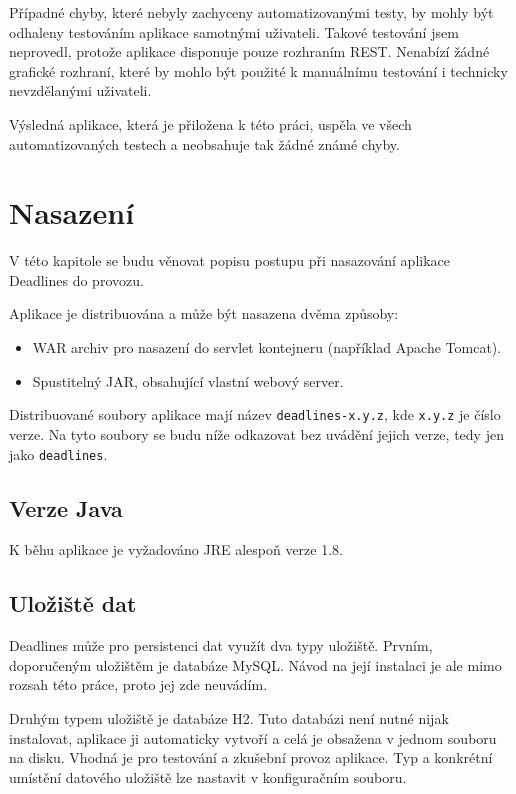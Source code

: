\documentclass[thesis=B,czech]{FITthesis}[2012/06/26]
\begin{document}
		Případné chyby, které nebyly zachyceny automatizovanými testy, by mohly být odhaleny testováním aplikace samotnými uživateli. Takové testování jsem neprovedl, protože aplikace disponuje pouze rozhraním REST. Nenabízí žádné grafické rozhraní, které by mohlo být použité k manuálnímu testování i technicky nevzdělanými uživateli.
		
		
		Výsledná aplikace, která je přiložena k této práci, uspěla ve všech automatizovaných testech a neobsahuje tak žádné známé chyby.


\chapter{Nasazení}
	\label{chapter:deployment}
	
	V této kapitole se budu věnovat popisu postupu při nasazování aplikace Deadlines do provozu.
	
	Aplikace je distribuována a může být nasazena dvěma způsoby:
	\begin{itemize}
		\item WAR archiv pro nasazení do servlet kontejneru (například Apache Tomcat).
		\item Spustitelný JAR, obsahující vlastní webový server.
	\end{itemize}
	Distribuované soubory aplikace mají název \texttt{deadlines-x.y.z}, kde \texttt{x.y.z} je číslo verze. Na tyto soubory se budu níže odkazovat bez uvádění jejich verze, tedy jen jako \texttt{deadlines}.
	
	\section{Verze Java}
		K běhu aplikace je vyžadováno JRE alespoň verze 1.8.
	
	\section{Uložiště dat}
		Deadlines může pro persistenci dat využít dva typy uložiště. Prvním, doporučeným uložištěm je databáze MySQL. Návod na její instalaci je ale mimo rozsah této práce, proto jej zde neuvádím.
	
		Druhým typem uložiště je databáze H2. Tuto databázi není nutné nijak instalovat, aplikace ji automaticky vytvoří a celá je obsažena v jednom souboru na disku. Vhodná je pro testování a zkušební provoz aplikace. Typ a konkrétní umístění datového uložiště lze nastavit v konfiguračním souboru.
	
\end{document}
